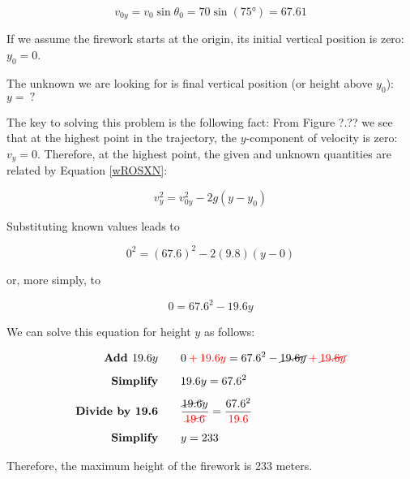 \documentclass{article}
\begin{document}
\begin{equation*}
    v_{0y} = v_0 \sin{\theta_0} = 70 \sin{(\ang{75})} = 67.61
\end{equation*}

If we assume the firework starts at the origin, its initial vertical position is zero: $y_0 = 0$.

\vspace{1em}

The unknown we are looking for is final vertical position (or height above $y_0$): $y =\ ?$ 

\vspace{1em}

The key to solving this problem is the following fact: From Figure ?.?? we see that at the highest point in the trajectory, the $y$-component of velocity is zero: $v_y = 0$. Therefore, at the highest point, the given and unknown quantities are related by Equation \eqref{wROSXN}:

\begin{equation*}
    v_y^2 = v_{0y}^2 - 2 g \left(y-y_0\right)
\end{equation*}

Substituting known values leads to

\begin{equation*}
    0^2 = \left(67.6\right)^2 - 2 (9.8) \left(y - 0\right)
\end{equation*}

or, more simply, to

\begin{equation*}
    0 = 67.6^2 - 19.6 y
\end{equation*}

We can solve this equation for height $y$ as follows:

\begin{align*}
    \textbf{Add $19.6 y$} \qquad & 0 \mathbin{\color{red} +} \textcolor{red}{19.6 y} = 67.6^2 - \cancel{19.6 y} \mathbin{\color{red} +} \textcolor{red}{\cancel{19.6 y}}\\[1ex]
    \textbf{Simplify} \qquad & 19.6 y = 67.6^2\\[1ex]
    \textbf{Divide by 19.6} \qquad & \frac{\cancel{19.6} y}{\textcolor{red}{\cancel{19.6}}} = \frac{67.6^2}{\textcolor{red}{19.6}}\\[1ex]
    \textbf{Simplify} \qquad & y = 233
\end{align*}

Therefore, the maximum height of the firework is 233 meters.

\endsolution
\end{document}
